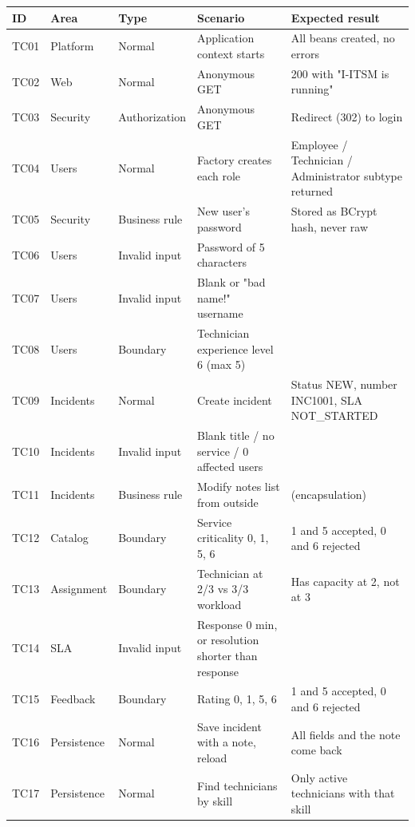 \begin{longtable}{@{}L{1.0cm}L{1.85cm}L{2.15cm}L{4.05cm}L{5.45cm}@{}}
\toprule
\textbf{ID} & \textbf{Area} & \textbf{Type} & \textbf{Scenario} & \textbf{Expected result} \\
\midrule\endhead
TC01 & Platform & Normal & Application context starts & All beans created, no errors \\
TC02 & Web & Normal & Anonymous GET \code{/} & 200 with "I-ITSM is running" \\
TC03 & Security & Authorization & Anonymous GET  & Redirect (302) to login \\
TC04 & Users & Normal & Factory creates each role & Employee / Technician / Administrator subtype returned \\
TC05 & Security & Business rule & New user's password & Stored as BCrypt hash, never raw \\
TC06 & Users & Invalid input & Password of 5 characters &  \\
TC07 & Users & Invalid input & Blank or "bad name!" username &  \\
TC08 & Users & Boundary & Technician experience level 6 (max 5) &  \\
TC09 & Incidents & Normal & Create incident & Status NEW, number INC1001, SLA NOT\_STARTED \\
TC10 & Incidents & Invalid input & Blank title / no service / 0 affected users &  \\
TC11 & Incidents & Business rule & Modify notes list from outside &  (encapsulation) \\
TC12 & Catalog & Boundary & Service criticality 0, 1, 5, 6 & 1 and 5 accepted, 0 and 6 rejected \\
TC13 & Assignment & Boundary & Technician at 2/3 vs 3/3 workload & Has capacity at 2, not at 3 \\
TC14 & SLA & Invalid input & Response 0 min, or resolution shorter than response &  \\
TC15 & Feedback & Boundary & Rating 0, 1, 5, 6 & 1 and 5 accepted, 0 and 6 rejected \\
TC16 & Persistence & Normal & Save incident with a note, reload & All fields and the note come back \\
TC17 & Persistence & Normal & Find technicians by skill & Only active technicians with that skill \\

\end{longtable}
